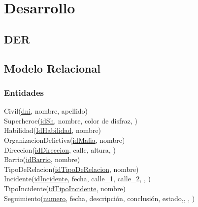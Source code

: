 \section{Desarrollo}

\subsection{DER} 

\subsection{Modelo Relacional}\label{modelo-relacional}

\subsubsection{Entidades}\label{entidades}

Civil(\uline{dni}, nombre, apellido)\\

Superheroe(\uline{idSh}, nombre, color de disfraz, )\\

Habilidad(\uline{IdHabilidad}, nombre)\\

OrganizacionDelictiva(\uline{idMafia}, nombre)\\

Direccion(\uline{idDireccion}, calle, altura, )\\

Barrio(\uline{idBarrio}, nombre)\\

TipoDeRelacion(\uline{idTipoDeRelacion}, nombre)\\

Incidente(\uline{idIncidente}, fecha, calle\_1, calle\_2,
, )\\

TipoIncidente(\uline{idTipoIncidente}, nombre)\\

Seguimiento(\uline{numero}, fecha, descripción, conclusión,
estado,, , )\\

